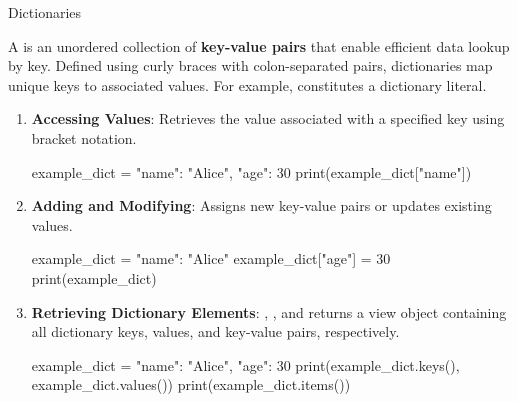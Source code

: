 \documentclass[10pt]{article}
\begin{document}
    \begin{core}{Dictionaries}

      A  is an unordered collection of \textbf{key-value pairs} that enable efficient data lookup by key. Defined using curly braces with colon-separated pairs, dictionaries map unique keys to associated values. For example,  constitutes a dictionary literal.

      \begin{enumerate}

        \item \textbf{Accessing Values}: Retrieves the value associated with a specified key using bracket notation.

        \begin{pyconsole}

          example_dict = {"name": "Alice", "age": 30}
          print(example_dict["name"])

        \end{pyconsole}

        \item \textbf{Adding and Modifying}: Assigns new key-value pairs or updates existing values.

        \begin{pyconsole}

          example_dict = {"name": "Alice"}
          example_dict["age"] = 30
          print(example_dict)

        \end{pyconsole}

        \item \textbf{Retrieving Dictionary Elements}: , , and  returns a view object containing all dictionary keys, values, and key-value pairs, respectively.

        \begin{pyconsole}

          example_dict = {"name": "Alice", "age": 30}
          print(example_dict.keys(), example_dict.values())
          print(example_dict.items())

        \end{pyconsole}

      \end{enumerate}

    \end{core}
\end{document}
